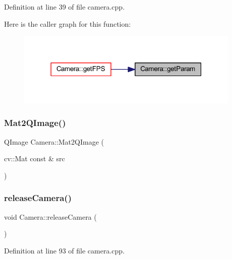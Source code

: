 Definition at line 39 of file camera.\+cpp.

Here is the caller graph for this function\+:
\nopagebreak
\begin{figure}[H]
\begin{center}
\leavevmode
\includegraphics[width=303pt]{class_camera_ab906269480057a5634f0760b3598e71f_icgraph}
\end{center}
\end{figure}
\mbox{\label{class_camera_ae24eefae4557e25d1582f40ead4a36cb}} 
\subsubsection{\texorpdfstring{Mat2QImage()}{Mat2QImage()}}
{\footnotesize\ttfamily Q\+Image Camera\+::\+Mat2\+Q\+Image (\begin{DoxyParamCaption}\item[{cv\+::\+Mat const \&}]{src }\end{DoxyParamCaption})\hspace{0.3cm}{\ttfamily [private]}}

\mbox{\label{class_camera_a08ea14c11fdb3be4a43d84db0bd1f9e5}} 
\subsubsection{\texorpdfstring{releaseCamera()}{releaseCamera()}}
{\footnotesize\ttfamily void Camera\+::release\+Camera (\begin{DoxyParamCaption}{ }\end{DoxyParamCaption})}



Definition at line 93 of file camera.\+cpp.

